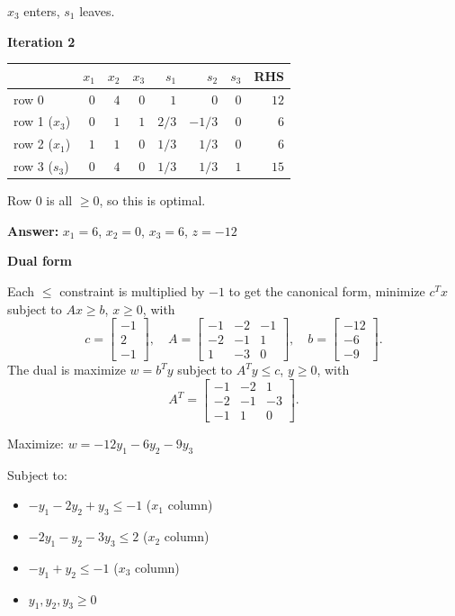 \documentclass{article}
\begin{document}
$x_3$ enters, $s_1$ leaves.

\textbf{Iteration 2}

\begin{center}
\begin{tabular}{lrrrrrrr}
\toprule
 & $x_1$ & $x_2$ & $x_3$ & $s_1$ & $s_2$ & $s_3$ & RHS \\
\midrule
row 0 & $0$ & $4$ & $0$ & $1$ & $0$ & $0$ & $12$ \\
row 1 ($x_3$) & $0$ & $1$ & $1$ & $2/3$ & $-1/3$ & $0$ & $6$ \\
row 2 ($x_1$) & $1$ & $1$ & $0$ & $1/3$ & $1/3$ & $0$ & $6$ \\
row 3 ($s_3$) & $0$ & $4$ & $0$ & $1/3$ & $1/3$ & $1$ & $15$ \\
\bottomrule
\end{tabular}
\end{center}

Row 0 is all $\ge 0$, so this is optimal.

\textbf{Answer:} $x_1 = 6$, $x_2 = 0$, $x_3 = 6$, $z = -12$

\textbf{Dual form}

Each $\le$ constraint is multiplied by $-1$ to get the canonical form, minimize $c^Tx$ subject to $Ax \ge b$, $x \ge 0$, with
\[
c = \begin{bmatrix} -1 \\ 2 \\ -1 \end{bmatrix}, \quad
A = \begin{bmatrix} -1 & -2 & -1 \\ -2 & -1 & 1 \\ 1 & -3 & 0 \end{bmatrix}, \quad
b = \begin{bmatrix} -12 \\ -6 \\ -9 \end{bmatrix}.
\]
The dual is maximize $w = b^Ty$ subject to $A^Ty \le c$, $y \ge 0$, with
\[
A^T = \begin{bmatrix} -1 & -2 & 1 \\ -2 & -1 & -3 \\ -1 & 1 & 0 \end{bmatrix}.
\]

Maximize: $w = -12y_1 - 6y_2 - 9y_3$

Subject to:
\begin{itemize}
    \item $-y_1 - 2y_2 + y_3 \le -1$ ($x_1$ column)
    \item $-2y_1 - y_2 - 3y_3 \le 2$ ($x_2$ column)
    \item $-y_1 + y_2 \le -1$ ($x_3$ column)
    \item $y_1, y_2, y_3 \ge 0$
\end{itemize}
\end{document}
